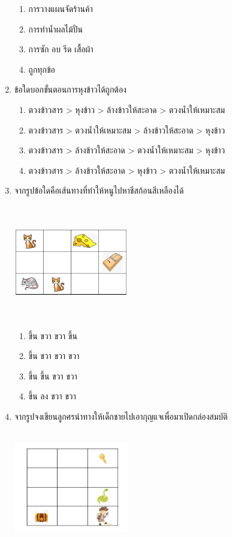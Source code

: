 \begin{enumerate}
    \begin{enumerate}
        \item การวางแผนจัดร้านค้า
        \item การทำน้ำผลไม้ปั่น
        \item การซัก อบ รีด เสื้อผ้า
        \item ถูกทุกข้อ
    \end{enumerate}
    \item ข้อใดบอกขั้นตอนการหุงข้าวได้ถูกต้อง
    \begin{enumerate}
        \item ตวงข้าวสาร > หุงข้าว > ล้างข้าวให้สะอาด > ตวงน้ำให้เหมาะสม
        \item ตวงข้าวสาร > ตวงน้ำให้เหมาะสม > ล้างข้าวให้สะอาด > หุงข้าว
        \item ตวงข้าวสาร > ล้างข้าวให้สะอาด > ตวงน้ำให้เหมาะสม > หุงข้าว
        \item ตวงข้าวสาร > ล้างข้าวให้สะอาด > หุงข้าว > ตวงน้ำให้เหมาะสม
    \end{enumerate}
    \item จากรูปข้อใดคือเส้นทางที่ทำให้หนูไปหาชีสก้อนสีเหลืองได้
    \begin{center}
        \includegraphics[width=5cm, height=5cm]{pic-toro/exam/cat.png}
    \end{center}
    \begin{enumerate}
        \item ขึ้น ขวา ขวา ขึ้น
        \item ขึ้น ขวา ขวา ขวา
        \item ขึ้น ขึ้น ขวา ขวา
        \item ขึ้น ลง ขวา ขวา
    \end{enumerate}
    \item จากรูปจงเขียนลูกศรนำทางให้เด็กชายไปเอากุญแจเพื่อมาเปิดกล่องสมบัติ
    \begin{center}
        \includegraphics[width=5cm, height=5cm]{pic-toro/exam/treasure.png}

\end{center}
\end{enumerate}
